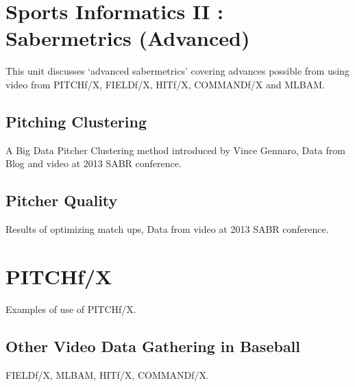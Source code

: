 \section{Sports Informatics II : Sabermetrics
(Advanced)}\label{sports-informatics-ii-sabermetrics-advanced}

This unit discusses `advanced sabermetrics' covering advances possible
from using video from PITCHf/X, FIELDf/X, HITf/X, COMMANDf/X and MLBAM.




\subsection{Pitching Clustering}\label{pitching-clustering}

A Big Data Pitcher Clustering method introduced by Vince Gennaro, Data
from Blog and video at 2013 SABR conference.




\subsection{Pitcher Quality}\label{pitcher-quality}

Results of optimizing match ups, Data from video at 2013 SABR
conference.





\section{PITCHf/X}\label{pitchfx}

Examples of use of PITCHf/X.




\subsection{Other Video Data Gathering in
Baseball}\label{other-video-data-gathering-in-baseball}

FIELDf/X, MLBAM, HITf/X, COMMANDf/X.




